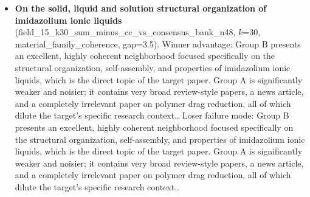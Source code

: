 \begin{itemize}
\item \textbf{On the solid, liquid and solution structural organization of imidazolium ionic liquids} (field\_15\_k30\_sum\_minus\_cc\_vs\_consensus\_bank\_n48, $k$=30, material\_family\_coherence, gap=3.5). Winner advantage: Group B presents an excellent, highly coherent neighborhood focused specifically on the structural organization, self-assembly, and properties of imidazolium ionic liquids, which is the direct topic of the target paper. Group A is significantly weaker and noisier; it contains very broad review-style papers, a news article, and a completely irrelevant paper on polymer drag reduction, all of which dilute the target's specific research context.. Loser failure mode: Group B presents an excellent, highly coherent neighborhood focused specifically on the structural organization, self-assembly, and properties of imidazolium ionic liquids, which is the direct topic of the target paper. Group A is significantly weaker and noisier; it contains very broad review-style papers, a news article, and a completely irrelevant paper on polymer drag reduction, all of which dilute the target's specific research context..
\end{itemize}
